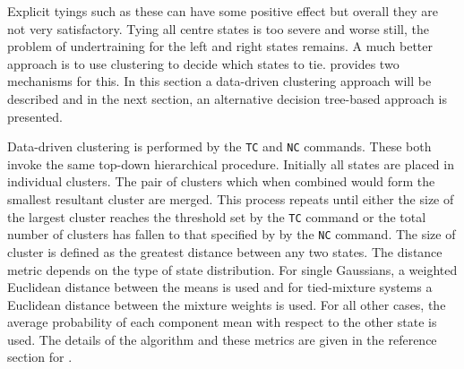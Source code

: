 Explicit tyings such as these can have some positive effect but overall they 
are not very satisfactory.  Tying all centre states is too severe and worse
still, the problem of undertraining for the left and right states remains.
A much better approach is to use clustering to decide which states to
tie.   provides two mechanisms for this.  In this section
a data-driven clustering approach will be described and in
the next section, an alternative decision tree-based approach is presented.

Data-driven clustering is performed by the 
\texttt{TC} and 
\texttt{NC}
commands.  These both invoke the same top-down hierarchical
procedure.  Initially all states are placed in individual
clusters.  The pair of clusters which when combined would form the smallest
resultant cluster are merged.  This process repeats until either the
size of the largest
cluster reaches the threshold set by the \texttt{TC} command or
the total number of clusters has fallen to that
specified by by the \texttt{NC} command.  The size of cluster
is defined as the greatest distance between any two states.
The distance metric depends on the type of state distribution.
For single Gaussians, a weighted Euclidean distance between the means
is used and for tied-mixture systems a  Euclidean distance between the
mixture weights is used.  For all other cases, the average probability
of each component mean with respect to the other state is used.
The details of the algorithm and these metrics are given in the reference
section for .


